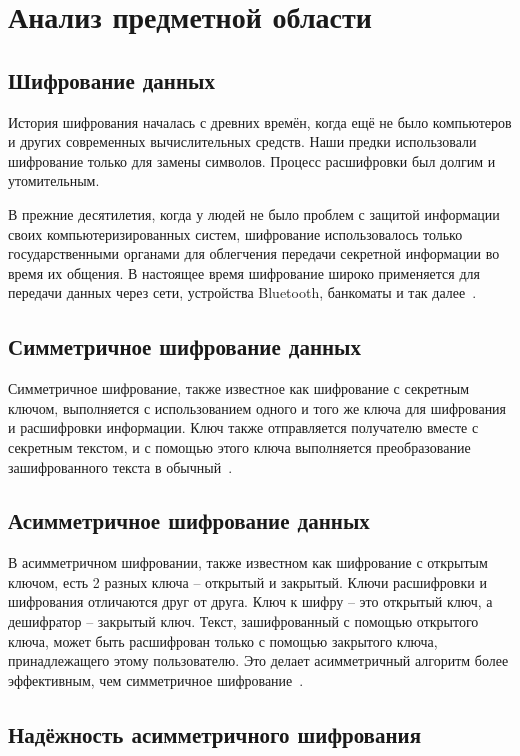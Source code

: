 \chapter{Анализ предметной области}

\section{Шифрование данных}

История шифрования началась с древних времён, когда ещё не было
компьютеров и других современных вычислительных средств. Наши предки
использовали шифрование только для замены символов. Процесс расшифровки был долгим и утомительным.

В прежние десятилетия, когда у людей не было проблем с защитой
информации своих компьютеризированных систем, шифрование
использовалось только государственными органами для облегчения передачи
секретной информации во время их общения. В настоящее время шифрование
широко применяется для передачи данных через сети, устройства Bluetooth, банкоматы и так далее~\cite{encrypting}.

\section{Симметричное шифрование данных}

Симметричное шифрование, также известное как шифрование с
секретным ключом, выполняется с использованием одного и того же ключа
для шифрования и расшифровки информации. Ключ также
отправляется получателю вместе с секретным текстом, и с помощью этого
ключа выполняется преобразование зашифрованного текста в обычный~\cite{sim-encrypting}.

\section{Асимметричное шифрование данных}

В асимметричном шифровании, также известном как шифрование с
открытым ключом, есть 2 разных ключа -- открытый и закрытый. Ключи расшифровки и шифрования отличаются друг от друга. Ключ к шифру -- это открытый ключ, а дешифратор -- закрытый ключ. Текст, зашифрованный с помощью открытого ключа, может быть расшифрован только с помощью закрытого ключа, принадлежащего этому пользователю. Это делает асимметричный алгоритм более эффективным, чем симметричное шифрование~\cite{asim-encrypting}.

\section{Надёжность асимметричного шифрования}

